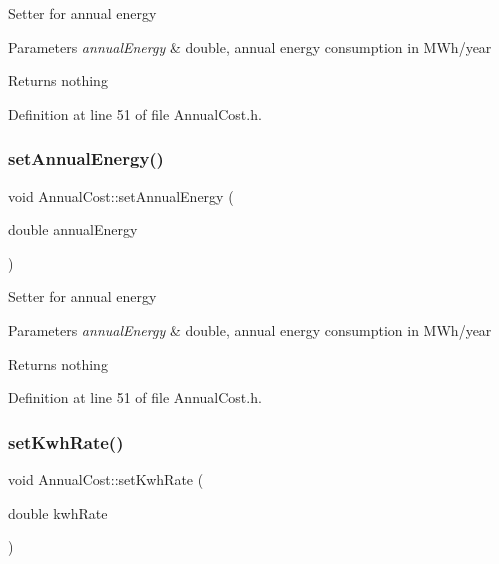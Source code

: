 Setter for annual energy 
\begin{DoxyParams}{Parameters}
{\em annual\+Energy} & double, annual energy consumption in M\+Wh/year \\
\hline
\end{DoxyParams}
\begin{DoxyReturn}{Returns}
nothing 
\end{DoxyReturn}


Definition at line 51 of file Annual\+Cost.\+h.

\mbox{\label{class_annual_cost_a4379cc7b591abefb2302d74c57227357}} 
\subsubsection{\texorpdfstring{set\+Annual\+Energy()}{setAnnualEnergy()}\hspace{0.1cm}{\footnotesize\ttfamily [3/3]}}
{\footnotesize\ttfamily void Annual\+Cost\+::set\+Annual\+Energy (\begin{DoxyParamCaption}\item[{double}]{annual\+Energy }\end{DoxyParamCaption})\hspace{0.3cm}{\ttfamily [inline]}}

Setter for annual energy 
\begin{DoxyParams}{Parameters}
{\em annual\+Energy} & double, annual energy consumption in M\+Wh/year \\
\hline
\end{DoxyParams}
\begin{DoxyReturn}{Returns}
nothing 
\end{DoxyReturn}


Definition at line 51 of file Annual\+Cost.\+h.

\mbox{\label{class_annual_cost_a45a1259c9912c7202dff446c290210e9}} 
\subsubsection{\texorpdfstring{set\+Kwh\+Rate()}{setKwhRate()}\hspace{0.1cm}{\footnotesize\ttfamily [1/3]}}
{\footnotesize\ttfamily void Annual\+Cost\+::set\+Kwh\+Rate (\begin{DoxyParamCaption}\item[{double}]{kwh\+Rate }\end{DoxyParamCaption})\hspace{0.3cm}{\ttfamily [inline]}}

